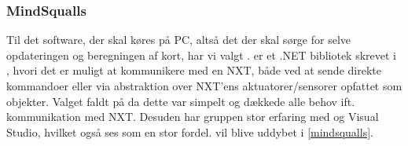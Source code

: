 \subsubsection*{MindSqualls}
Til det software, der skal køres på PC, altså det der skal sørge for selve opdateringen og beregningen af kort, har vi valgt \mindsqualls.
\mindsqualls er et .NET bibliotek skrevet i \csharp, hvori det er muligt at kommunikere med en NXT, både ved at sende direkte kommandoer eller via abstraktion over NXT'ens aktuatorer/sensorer opfattet som objekter.
Valget faldt på \mindsqualls da dette var simpelt og dækkede alle behov ift. kommunikation med NXT.
Desuden har gruppen stor erfaring med \csharp og Visual Studio, hvilket også ses som en stor fordel.
\mindsqualls vil blive uddybet i \cref{mindsqualls}.

